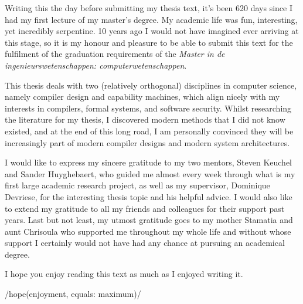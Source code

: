 \documentclass[master=cws, oneside, english, extralanguage=dutch]{kulemt}	%
\newcommand{\onlyinsubfile}[1]{#1}
\newcommand{\notinsubfile}[1]{}
\newcommand{\biblio}{}
\begin{document}
\renewcommand{\onlyinsubfile}[1]{}
\renewcommand{\notinsubfile}[1]{#1}
\def\biblio{}

\begin{preface}
	Writing this the day before submitting my thesis text, it's been 620 days since I had my first lecture of my master's degree. My academic life was fun, interesting, yet incredibly serpentine. 10 years ago I would not have imagined ever arriving at this stage, so it is my honour and pleasure to be able to submit this text for the fulfilment of the graduation requirements of the \emph{Master in de ingenieurswetenschappen: computerwetenschappen}.
	
	This thesis deals with two (relatively orthogonal) disciplines in computer science, namely compiler design and capability machines, which align nicely with my interests in compilers, formal systems, and software security. Whilst researching the literature for my thesis, I discovered modern methods that I did not know existed, and at the end of this long road, I am personally convinced they will be increasingly part of modern compiler designs and modern system architectures.
	
	I would like to express my sincere gratitude to my two mentors, Steven Keuchel and Sander Huyghebaert, who guided me almost every week through what is my first large academic research project, as well as my supervisor, Dominique Devriese, for the interesting thesis topic and his helpful advice. I would also like to extend my gratitude to all my friends and colleagues for their support past years. Last but not least, my utmost gratitude goes to my mother Stamatia and aunt Chrisoula who supported me throughout my whole life and without whose support I certainly would not have had any chance at pursuing an academical degree.
	
	I hope you enjoy reading this text as much as I enjoyed writing it.
	
	\iil/hope(enjoyment, equals: maximum)/
\end{preface}

\tableofcontents*




\mainmatter








\appendix



\backmatter
\glsaddall
{}
\printglossaries


\end{document}
